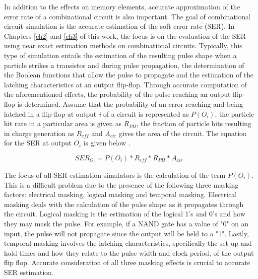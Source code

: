 In addition to the effects on memory elements, accurate approximation of the error rate of a combinational circuit is also important. The goal of combinational circuit simulation is the accurate estimation of the soft error rate (SER). In Chapters \ref{ch2} and \ref{ch3} of this work, the focus is on the evaluation of the SER using near exact estimation methods on combinational circuits. Typically, this type of simulation entails the estimation of the resulting pulse shape when a particle strikes a transistor and during pulse propagation, the determination of the Boolean functions that allow the pulse to propagate and the estimation of the latching characteristics at an output flip-flop. Through accurate computation of the aforementioned effects, the probability of the pulse reaching an output flip-flop is determined. Assume that the probability of an error reaching and being latched in a flip-flop at output \textit{i} of a circuit is represented as \textit{$P(O_i)$}, the particle hit rate in a particular area is given as \textit{$R_{PH}$}, the fraction of particle hits resulting in charge generation as \textit{$R_{eff}$} and \textit{$A_{cir}$} gives the area of the circuit. The equation for the SER at output \textit{$O_i$} is given below \cite{METSys}.

\begin{equation}\label{SER_eq}
SER_{O_i} = P(O_i) * R_{eff} * R_{PH} * A_{cir}
\end{equation}

The focus of all SER estimation simulators is the calculation of the term \textit{$P(O_i)$}. This is a difficult problem due to the presence of the following three masking factors: electrical masking, logical masking and temporal masking. Electrical masking deals with the calculation of the pulse shape as it propagates through the circuit. Logical masking is the estimation of the logical 1's and 0's and how they may mask the pulse. For example, if a NAND gate has a value of "0" on an input, the pulse will not propagate since the output will be held to a "1". Lastly, temporal masking involves the latching characteristics, specifically the set-up and hold times and how they relate to the pulse width and clock period, of the output flip flop. Accurate consideration of all three masking effects is crucial to accurate SER estimation.

